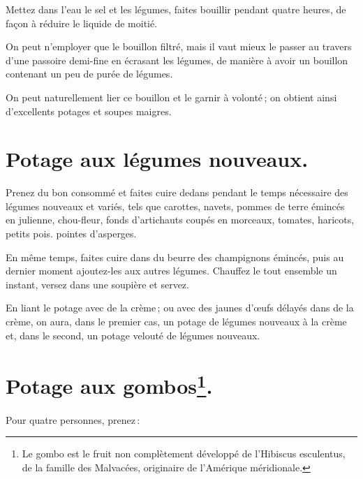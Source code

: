Mettez dans l'eau le sel et les légumes, faites bouillir pendant quatre heures,
de façon à réduire le liquide de moitié.

\sk

On peut n'employer que le bouillon filtré, mais il vaut mieux le passer au
travers d'une passoire demi-fine en écrasant les légumes, de manière à avoir un
bouillon contenant un peu de purée de légumes.

\sk

On peut naturellement lier ce bouillon et le garnir à volonté ; on obtient ainsi
d'excellents potages et soupes maigres.

\section*{\centering Potage aux légumes nouveaux.}

Prenez du bon consommé et faites cuire dedans pendant le temps nécessaire des
légumes nouveaux et variés, tels que carottes, navets, pommes de terre émincés
en julienne, chou-fleur, fonds d'artichauts coupés en morceaux, tomates,
haricots, petits pois. pointes d’asperges.

En même temps, faites cuire dans du beurre des champignons émincés, puis au
dernier moment ajoutez-les aux autres légumes. Chauffez le tout ensemble un
instant, versez dans une soupière et servez.

\sk

En liant le potage avec de la crème ; ou avec des jaunes d'œufs délayés dans de
la crème, on aura, dans le premier cas, un potage de légumes nouveaux à la
crème et, dans le second, un potage velouté de légumes nouveaux.

\section*{\centering Potage aux gombos\footnote{Le gombo est le fruit non
complètement développé de l'Hibiscus esculentus, de la famille des Malvacées,
originaire de l'Amérique méridionale.}.}

\medskip

Pour quatre personnes, prenez :

\medskip


